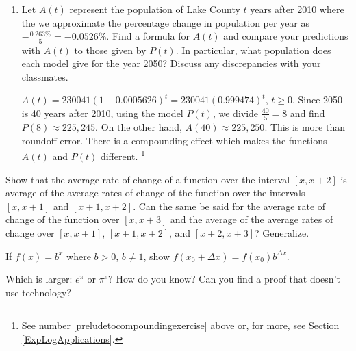 \documentclass{ximera}
\begin{document}
\begin{problem}
\begin{enumerate}
\item  Let $A(t)$  represent the population of Lake County $t$ years after 2010 where the we approximate the percentage change in population per year as $-\frac{0.263 \%}{5} = -0.0526 \%$.    Find a formula for $A(t)$ and compare your predictions with $A(t)$ to those given by $P(t)$.  In particular, what population does each model give for the year 2050?  Discuss any discrepancies with your classmates.

\begin{solution}
$A(t) = 230041(1 - 0.0005626)^{t} =  230041 (0.999474)^{t}$, $t \geq 0$.  Since 2050 is 40 years after 2010, using the model $P(t)$, we divide $\frac{40}{5} = 8$ and find $P(8) \approx 225,245$. On the other hand, $A(40) \approx 225,250$.  This is more than roundoff error.  There is a compounding effect which makes the functions $A(t)$ and $P(t)$ different. \footnote{See number \ref{preludetocompoundingexercise} above or, for more, see Section \ref{ExpLogApplications}.}

\end{solution}

\end{enumerate}
   
\end{problem} 
  
\begin{problem}\label{averageofarc}  
Show that the average rate of change of a function over the interval  $[x, x+2]$ is average of the average rates of change of the function over the intervals $[x,x+1]$ and $[x+1, x+2]$.  Can the same be said for the average rate of change of the function over $[x, x+3]$ and the average of the average rates of change over $[x, x+1]$, $[x+1, x+2]$, and $[x+2, x+3]$?  Generalize.
\end{problem}

\begin{problem}\label{exponentialchangeexercise}  
If $f(x) = b^{x}$ where $b>0$, $b \neq 1$,  show $f(x_{0}+\Delta x) = f(x_{0}) b^{\Delta x}$.
    
\end{problem}

\begin{problem}
Which is larger: $e^{\pi}$ or $\pi^{e}$?  How do you know?  Can you find a proof that doesn't use technology?   
\end{problem}
\end{document}
